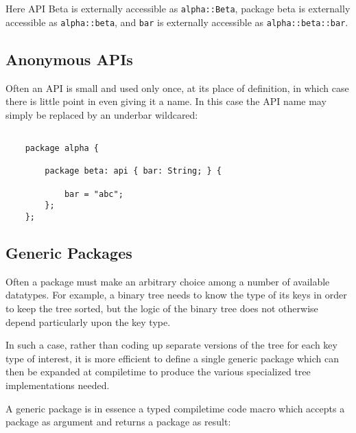 Here API Beta is externally accessible as {\tt alpha::Beta}, 
package beta is externally accessible as {\tt alpha::beta}, 
and {\tt bar} is externally accessible as  {\tt alpha::beta::bar}.

\cutend*

\subsection{Anonymous APIs}
\label{section:ref:anonymous-apis}

Often an API is small and used only once, at its 
place of definition, in which case there is little 
point in even giving it a name.  In this case the 
API name may simply be replaced by an underbar 
wildcared:

\begin{verbatim}

    package alpha {

        package beta: api { bar: String; } {

            bar = "abc";
        };
    };

\end{verbatim}

\cutend*

\subsection{Generic Packages}
\label{section:ref:generic-packages}

Often a package must make an arbitrary choice among 
a number of available datatypes.  For example, a 
binary tree needs to know the type of its keys in 
order to keep the tree sorted, but the logic of the 
binary tree does not otherwise depend particularly upon 
the key type. 

In such a case, rather than coding  up separate 
versions of the tree for each key type of interest, 
it is more efficient to define a single generic 
package which can then be expanded at compiletime 
to produce the various specialized tree implementations 
needed.

A generic package is in essence a typed compiletime 
code macro which accepts a package as argument and 
returns a package as result:


